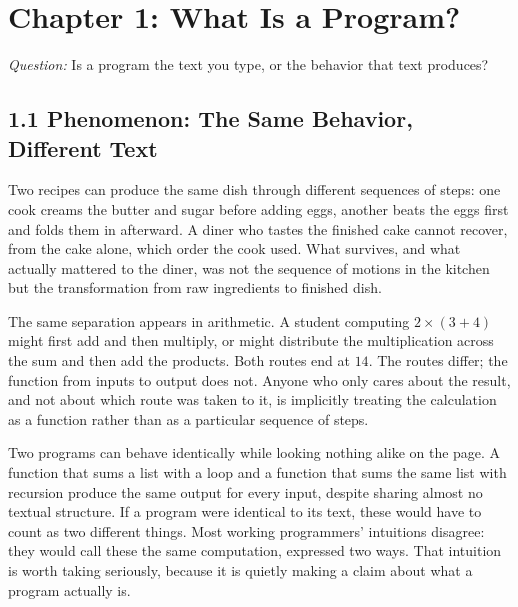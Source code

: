 \documentclass[11pt]{book}
\begin{document}
\clearpage

\chapter*{Chapter 1: What Is a Program?}

\begin{firstprinciples}
\textit{Question:} Is a program the text you type, or the behavior that text produces?
\end{firstprinciples}

\section*{1.1 Phenomenon: The Same Behavior, Different Text}

Two recipes can produce the same dish through different sequences of steps: one cook creams the butter and sugar before adding eggs, another beats the eggs first and folds them in afterward. A diner who tastes the finished cake cannot recover, from the cake alone, which order the cook used. What survives, and what actually mattered to the diner, was not the sequence of motions in the kitchen but the transformation from raw ingredients to finished dish.

The same separation appears in arithmetic. A student computing $2 \times (3 + 4)$ might first add and then multiply, or might distribute the multiplication across the sum and then add the products. Both routes end at $14$. The routes differ; the function from inputs to output does not. Anyone who only cares about the result, and not about which route was taken to it, is implicitly treating the calculation as a function rather than as a particular sequence of steps.

Two programs can behave identically while looking nothing alike on the page. A function that sums a list with a loop and a function that sums the same list with recursion produce the same output for every input, despite sharing almost no textual structure. If a program were identical to its text, these would have to count as two different things. Most working programmers' intuitions disagree: they would call these the same computation, expressed two ways. That intuition is worth taking seriously, because it is quietly making a claim about what a program actually is.
\end{document}
